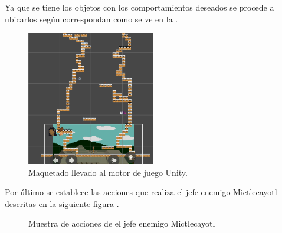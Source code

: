 Ya que se tiene los objetos con los comportamientos deseados se procede a ubicarlos según correspondan como se ve en la \cite{fig:n504}.
\begin{figure}
	\centering
	\caption{Maquetado llevado al motor de juego Unity.}
	\label{fig:n504}
	\includegraphics[width=0.5\textwidth]{03TrabajoRealizado/DocProduccionR/imagenes/n5/n501.png}
\end{figure}

Por último se establece las acciones que realiza el jefe enemigo Mictlecayotl descritas en la siguiente figura \cite{fig:n505}.
\begin{figure}[htbp]
	\centering
	\caption{Muestra de acciones de el jefe enemigo Mictlecayotl} \label{fig:n505}
\end{figure}